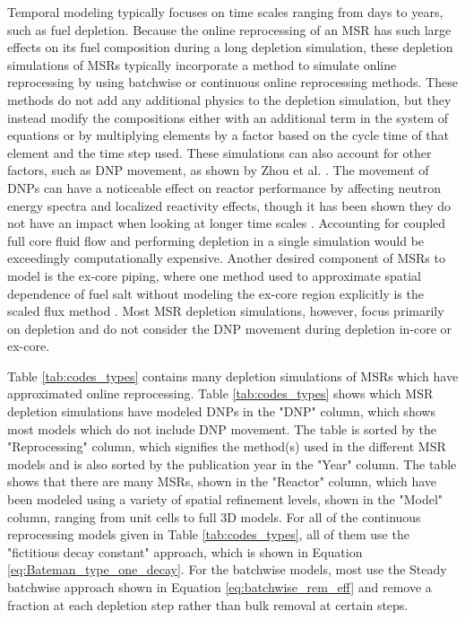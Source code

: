 Temporal modeling typically focuses on time scales ranging from days to years, such as fuel depletion. Because the online reprocessing of an MSR has such large effects on its fuel composition during a long depletion simulation, these depletion simulations of MSRs typically incorporate a method to simulate online reprocessing by using batchwise or continuous online reprocessing methods. These methods do not add any additional physics to the depletion simulation, but they instead modify the compositions either with an additional term in the system of equations or by multiplying elements by a factor based on the cycle time of that element and the time step used.
These simulations can also account for other factors, such as DNP movement, as shown by Zhou et al. \cite{zhou_fuel_2018}.
The movement of DNPs can have a noticeable effect on reactor performance by affecting neutron energy spectra and localized reactivity effects, though it has been shown they do not have an impact when looking at longer time scales \cite{betzler_implementation_2017}.
Accounting for coupled full core fluid flow and performing depletion in a single simulation would be exceedingly computationally expensive.
Another desired component of MSRs to model is the ex-core piping, where one method used to approximate spatial dependence of fuel salt without modeling the ex-core region explicitly is the scaled flux method \cite{betzler_liquid-fueled_2021}.
Most MSR depletion simulations, however, focus primarily on depletion and do not consider the DNP movement during depletion in-core or ex-core.

Table \ref{tab:codes_types} contains many depletion simulations of MSRs which have approximated online reprocessing.
Table \ref{tab:codes_types} shows which MSR depletion simulations have modeled DNPs in the "DNP" column, which shows most models which do not include DNP movement.
The table is sorted by the "Reprocessing" column, which signifies the method(s) used in the different MSR models and is also sorted by the publication year in the "Year" column.
The table shows that there are many MSRs, shown in the "Reactor" column, which have been modeled using a variety of spatial refinement levels, shown in the "Model" column, ranging from unit cells to full 3D models.
For all of the continuous reprocessing models given in Table \ref{tab:codes_types}, all of them use the "fictitious decay constant" approach, which is shown in Equation \eqref{eq:Bateman_type_one_decay}.
 For the batchwise models, most use the Steady batchwise approach shown in Equation \eqref{eq:batchwise_rem_eff} and remove a fraction at each depletion step rather than bulk removal at certain steps.

